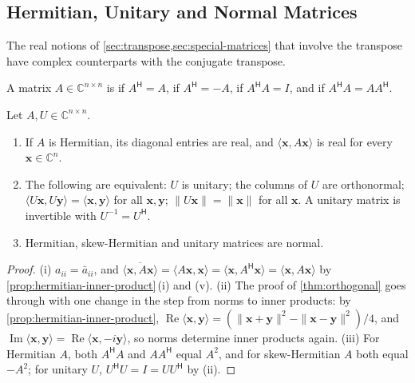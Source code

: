 \subsection{Hermitian, Unitary and Normal Matrices}

The real notions of \cref{sec:transpose,sec:special-matrices} that involve the transpose have complex counterparts with the conjugate transpose.

\begin{definition}
\label{def:hermitian-unitary}
A matrix $A\in\mathbb C^{n\times n}$ is  if $A^{\mathsf H}=A$,  if $A^{\mathsf H}=-A$,  if $A^{\mathsf H}A=I$, and  if $A^{\mathsf H}A=AA^{\mathsf H}$.
\end{definition}

\begin{proposition}
\label{prop:hermitian-unitary}
Let $A,U\in\mathbb C^{n\times n}$.
\begin{enumerate}
\item If $A$ is Hermitian, its diagonal entries are real, and $\langle\mathbf x,A\mathbf x\rangle$ is real for every $\mathbf x\in\mathbb C^n$.
\item The following are equivalent: $U$ is unitary; the columns of $U$ are orthonormal; $\langle U\mathbf x,U\mathbf y\rangle=\langle\mathbf x,\mathbf y\rangle$ for all $\mathbf x,\mathbf y$; $\|U\mathbf x\|=\|\mathbf x\|$ for all $\mathbf x$. A unitary matrix is invertible with $U^{-1}=U^{\mathsf H}$.
\item Hermitian, skew-Hermitian and unitary matrices are normal.
\end{enumerate}
\end{proposition}

\begin{proof}
(i) $a_{ii}=\bar a_{ii}$, and $\overline{\langle\mathbf x,A\mathbf x\rangle}=\langle A\mathbf x,\mathbf x\rangle=\langle\mathbf x,A^{\mathsf H}\mathbf x\rangle=\langle\mathbf x,A\mathbf x\rangle$ by \cref{prop:hermitian-inner-product}\,(i) and (v). (ii) The proof of \cref{thm:orthogonal} goes through with one change in the step from norms to inner products: by \cref{prop:hermitian-inner-product}, $\operatorname{Re}\langle\mathbf x,\mathbf y\rangle=(\|\mathbf x+\mathbf y\|^2-\|\mathbf x-\mathbf y\|^2)/4$, and $\operatorname{Im}\langle\mathbf x,\mathbf y\rangle=\operatorname{Re}\langle\mathbf x,-i\mathbf y\rangle$, so norms determine inner products again. (iii) For Hermitian $A$, both $A^{\mathsf H}A$ and $AA^{\mathsf H}$ equal $A^2$, and for skew-Hermitian $A$ both equal $-A^2$; for unitary $U$, $U^{\mathsf H}U=I=UU^{\mathsf H}$ by (ii).
\end{proof}

